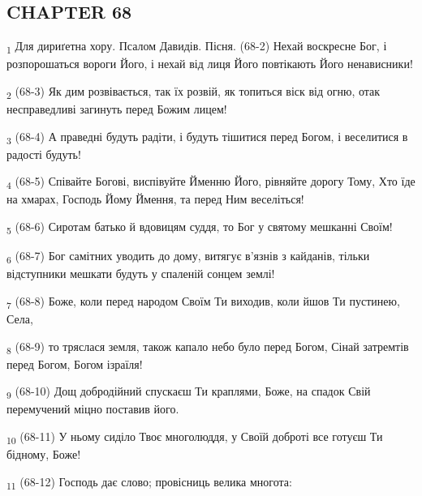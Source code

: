 \subsection{CHAPTER 68}
\begin{tcolorbox}
\textsubscript{1} Для дириґетна хору. Псалом Давидів. Пісня. (68-2) Нехай воскресне Бог, і розпорошаться вороги Його, і нехай від лиця Його повтікають Його ненависники!
\end{tcolorbox}
\begin{tcolorbox}
\textsubscript{2} (68-3) Як дим розвівається, так їх розвій, як топиться віск від огню, отак несправедливі загинуть перед Божим лицем!
\end{tcolorbox}
\begin{tcolorbox}
\textsubscript{3} (68-4) А праведні будуть радіти, і будуть тішитися перед Богом, і веселитися в радості будуть!
\end{tcolorbox}
\begin{tcolorbox}
\textsubscript{4} (68-5) Співайте Богові, виспівуйте Йменню Його, рівняйте дорогу Тому, Хто їде на хмарах, Господь Йому Ймення, та перед Ним веселіться!
\end{tcolorbox}
\begin{tcolorbox}
\textsubscript{5} (68-6) Сиротам батько й вдовицям суддя, то Бог у святому мешканні Своїм!
\end{tcolorbox}
\begin{tcolorbox}
\textsubscript{6} (68-7) Бог самітних уводить до дому, витягує в'язнів з кайданів, тільки відступники мешкати будуть у спаленій сонцем землі!
\end{tcolorbox}
\begin{tcolorbox}
\textsubscript{7} (68-8) Боже, коли перед народом Своїм Ти виходив, коли йшов Ти пустинею, Села,
\end{tcolorbox}
\begin{tcolorbox}
\textsubscript{8} (68-9) то тряслася земля, також капало небо було перед Богом, Сінай затремтів перед Богом, Богом ізраїля!
\end{tcolorbox}
\begin{tcolorbox}
\textsubscript{9} (68-10) Дощ добродійний спускаєш Ти краплями, Боже, на спадок Свій перемучений міцно поставив його.
\end{tcolorbox}
\begin{tcolorbox}
\textsubscript{10} (68-11) У ньому сиділо Твоє многолюддя, у Своїй доброті все готуєш Ти бідному, Боже!
\end{tcolorbox}
\begin{tcolorbox}
\textsubscript{11} (68-12) Господь дає слово; провісниць велика многота:
\end{tcolorbox}
